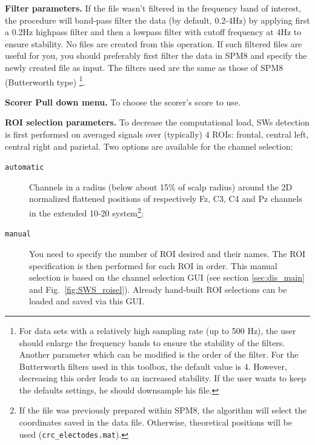 \documentclass[a4paper,titlepage]{article}
\begin{document}
\item {\bf Filter parameters.}
If the file wasn't filtered in the frequency band of interest, the procedure will band-pass filter the data (by default, 0.2-4Hz) by applying first a 0.2Hz highpass filter and then a lowpass filter with cutoff frequency at 4Hz to ensure stability. No files are created from this operation. If such filtered files are useful for you, you should preferably first filter the data in SPM8 and specify the newly created file as input. The filters used are the same as those of SPM8 (Butterworth type)
\footnote{For data sets with a relatively high sampling rate (up to 500 Hz), the user should enlarge the frequency bands to ensure the stability of the filters. Another parameter which can be modified is the order of the filter. For the Butterworth filters used in this toolbox, the default value is 4. However, decreasing this order leads to an increased stability. If the user wants to keep the defaults settings, he should downsample his file.}.

\item {\bf Scorer Pull down menu.} To choose the scorer's score to use.

\item {\bf ROI selection parameters.}
To decrease the computational load, SWs detection is first performed on averaged signals over (typically) 4 ROIs: frontal, central left, central right and parietal. Two options are available for the channel selection: 
\begin{description}
\item[\tt automatic] Channels in a radius (below about 15\% of scalp radius) around the 2D normalized flattened positions of respectively Fz, C3, C4 and Pz channels in the extended 10-20 system\footnote{If the file was previously prepared within SPM8, the algorithm will select the coordinates saved in the data file. Otherwise, theoretical positions will be used ({\tt crc\_electodes.mat}).}; 
\item[\tt manual] You need to specify the number of ROI desired and their names. The ROI specification is then performed for each ROI in order. This manual selection is based on the channel selection GUI (see section \ref{sec:dis_main} and Fig.~\ref{fig:SWS_roisel}). Already hand-built ROI selections can be loaded and saved via this GUI.
\end{description}
\end{document}
